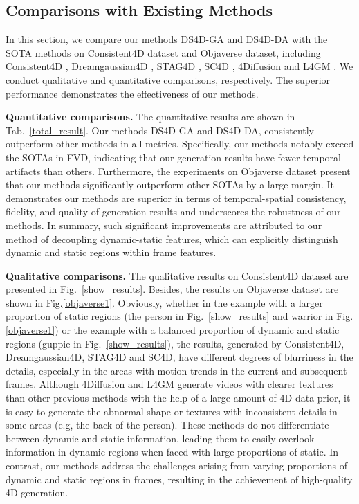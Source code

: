 \subsection{Comparisons with Existing Methods}
In this section, we compare our methods DS4D-GA and DS4D-DA with the SOTA methods on Consistent4D dataset and Objaverse dataset, including Consistent4D \cite{jiang2024consistentd}, Dreamgaussian4D \cite{ren2023dreamgaussian4d}, STAG4D \cite{zeng2024stag4d}, SC4D \cite{wu2024sc4d}, 4Diffusion \cite{zhang20244diffusion} and L4GM \cite{ren2024l4gm}. We conduct qualitative and quantitative comparisons, respectively. The superior performance demonstrates the effectiveness of our methods. 


\textbf{Quantitative comparisons.} The quantitative results are shown in Tab.~\ref{total_result}. Our methods DS4D-GA and DS4D-DA, consistently outperform other methods in all metrics. Specifically, our methods notably exceed the SOTAs in FVD, indicating that our generation results have fewer temporal artifacts than others. Furthermore, the experiments on Objaverse dataset present that our methods significantly outperform other SOTAs by a large margin. It demonstrates our methods are superior in terms of temporal-spatial consistency, fidelity, and quality of generation results and underscores the robustness of our methods. In summary, such significant improvements are attributed to our method of decoupling dynamic-static features, which can explicitly distinguish dynamic and static regions within frame features. 


\textbf{Qualitative comparisons.} The qualitative results on Consistent4D dataset are presented in Fig.~\ref{show_results}. Besides, the results on Objaverse dataset are shown in Fig.\ref{objaverse1}. Obviously, whether in the example with a larger proportion of static regions (the person in Fig.~\ref{show_results} and warrior in Fig.\ref{objaverse1}) or the example with a balanced proportion of dynamic and static regions (guppie in Fig.~\ref{show_results}), the results, generated by Consistent4D, Dreamgaussian4D, STAG4D and SC4D, have different degrees of blurriness in the details, especially in the areas with motion trends in the current and subsequent frames. Although 4Diffusion and L4GM generate videos with clearer textures than other previous methods with the help of a large amount of 4D data prior, it is easy to generate the abnormal shape or textures with inconsistent details in some areas (e.g, the back of the person). These methods do not differentiate between dynamic and static information, leading them to easily overlook information in dynamic regions when faced with large proportions of static. In contrast, our methods address the challenges arising from varying proportions of dynamic and static regions in frames, resulting in the achievement of high-quality 4D generation.

